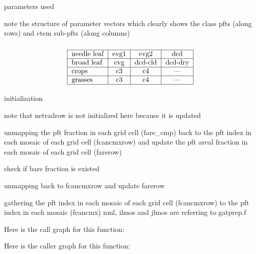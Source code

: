  parameters used

note the structure of parameter vectors which clearly shows the class pfts (along rows) and ctem sub-\/pfts (along columns) \subsubsection*{\[ \begin{tabular} { | l | c | c | c | } \hline needle leaf & evg1 & evg2 & dcd \\ \hline broad leaf & evg & dcd-cld & dcd-dry \\ \hline crops & c3 & c4 & --- \\ \hline grasses & c3 & c4 & --- \\ \hline \end{tabular} \] }

initialization

note that netradrow is not initialized here because it is updated

unmapping the pft fraction in each grid cell (fare\+\_\+cmp) back to the pft index in each mosaic of each grid cell (fcancmxrow) and update the pft areal fraction in each mosaic of each grid cell (farerow)

check if bare fraction is existed

unmapping back to fcancmxrow and update farerow

gathering the pft index in each mosaic of each grid cell (fcancmxrow) to the pft index in each mosaic (fcancmx) nml, ilmos and jlmos are referring to gatprep.\+f

Here is the call graph for this function\+:




Here is the caller graph for this function\+:


